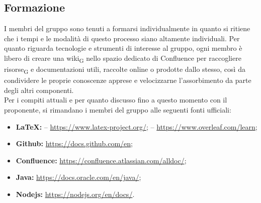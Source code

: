 \subsection{Formazione}
    I membri del gruppo \group sono tenuti a formarsi individualmente in quanto si ritiene che i tempi e le modalità di questo processo siano altamente individuali. Per quanto riguarda tecnologie e strumenti di interesse al gruppo, ogni membro è libero di creare una wiki\textsubscript{G} nello spazio dedicato di Confluence per raccogliere risorse\textsubscript{G} e documentazioni utili, raccolte online o prodotte dallo stesso, così da condividere le proprie conoscenze apprese e velocizzarne l'assorbimento da parte degli altri componenti. \\
    Per i compiti attuali e per quanto discusso fino a questo momento con il proponente, si rimandano i membri del gruppo alle seguenti fonti ufficiali:
    \begin{itemize}
        \item \textbf{\LaTeX: }
            \subitem -- \url{https://www.latex-project.org/};
            \subitem -- \url{https://www.overleaf.com/learn};
        \item \textbf{Github: }\url{https://docs.github.com/en};
        \item \textbf{Confluence: }\url{https://confluence.atlassian.com/alldoc/};
        \item \textbf{Java: }\url{https://docs.oracle.com/en/java/};
        \item \textbf{Nodejs: }\url{https://nodejs.org/en/docs/}.
    \end{itemize}